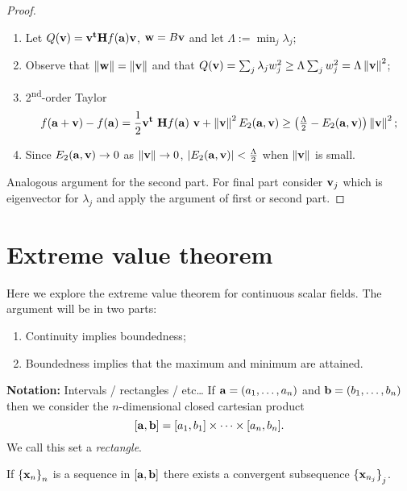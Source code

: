 \begin{proof}
    \begin{enumerate}
        \item Let \(Q(\vv) =  \vv^{\mathbf{t}} \mathbf{H} f (\aa) \vv  \),  \(\ww = B \vv\) and let \(\Lambda := \min_j \lambda_j\);
        \item Observe that \(\norm{\ww} =  \norm{\vv}\) and that \(Q(\vv)=  \sum_{j} \lambda_j w_j^2  \geq \Lambda \sum_{j} w_j^2 = \Lambda  \norm{\vv}^2 \);
        \item 2\textsuperscript{nd}-order Taylor
              \vspace{-1em}
              \[
                  f(\aa+\vv) - f(\aa)
                  =  \frac{1}{2} \vv^{\mathbf{t}} \ \mathbf{H} f (\aa) \ \vv + \norm{\vv}^2 E_2(\aa,\vv)
                  \geq  \left(\tfrac{\Lambda}{2} - E_2(\aa,\vv) \right) \norm{\vv}^2;
              \]
        \item Since \(E_2(\aa,\vv) \to 0\) as \(\norm{\vv}\to 0\), \(\abs{E_2(\aa,\vv)} < \tfrac{\Lambda}{2}\) when \(\norm{\vv}\) is small.
    \end{enumerate}
    Analogous argument for the second part. For final part consider \(\vv_j\) which is eigenvector for \(\lambda_j\) and apply the argument of first or second part.
\end{proof}



\section{Extreme value theorem}

Here we explore the extreme value theorem for continuous scalar fields.
The argument will be in two parts:
\begin{enumerate}
    \item Continuity implies boundedness;
    \item Boundedness implies that the maximum and minimum are attained.
\end{enumerate}

\textbf{Notation:}
Intervals / rectangles / etc\ldots
If \(\aa = (a_1,\ldots,a_n)\) and  \(\bb = (b_1,\ldots,b_n)\)
then we consider the \(n\)-dimensional closed cartesian product
\[
    [\aa,\bb] = [a_1,b_1] \times \cdots \times [a_n,b_n].
\]
We call this set a \emph{rectangle}.




\begin{theorem}
    If \({\{\xx_{n}\}}_{n}\) is a sequence in \( [\aa,\bb]\)
    there exists a convergent subsequence \({\{\xx_{n_j}\}}_{j}\).
\end{theorem}

